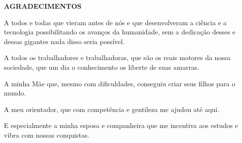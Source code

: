 \setlength{\parindent}{0pt}
\newpage \thispagestyle{empty}
\vspace{1.5cm}
\fontsize{12}{\baselineskip} \selectfont

\begin{center}
	{\huge{\textbf{AGRADECIMENTOS}}}
\end{center}

\begin{myenv}{1.5}
	\fontsize{12}{\baselineskip} \selectfont \onehalfspacing
	\par \null
	\par \null
	\par A todos e todas que vieram antes de nós e que desenvolveram a ciência e a tecnologia possibilitando os avanços da humanidade, sem a dedicação desses e dessas gigantes nada disso seria possível.
	\par A todos os trabalhadores e trabalhadoras, que são os reais motores da nossa sociedade, que um dia o conhecimento os liberte de suas amarras.
	\par A minha Mãe que, mesmo com dificuldades, conseguiu criar seus filhos para o mundo.
	\par A meu orientador, que com competência e gentileza me ajudou até aqui.\\
	\par E especialmente a minha esposa e companheira que me incentiva aos estudos e vibra com nossas conquistas.
\end{myenv}